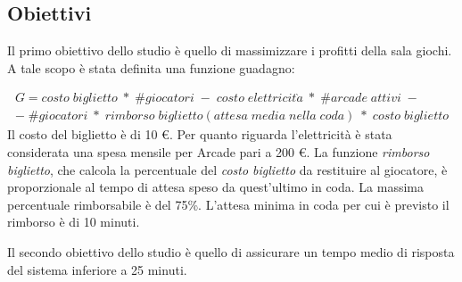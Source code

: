 \documentclass{article}
\begin{document}
\subsection{Obiettivi}
\par Il primo obiettivo dello studio è quello di massimizzare i profitti della sala giochi. A tale scopo è stata definita una funzione guadagno:

\begin{equation}
\begin{split}
   G = costo\; biglietto \;*\; \#giocatori\; -\; costo\; elettricit\grave a \;*\; \#arcade \;attivi\; - \\-\; \#giocatori \;*\; rimborso \;biglietto(attesa\;media\;nella\;coda)\;*\;costo\;biglietto
\end{split}
\end{equation}
Il costo del biglietto è di 10 \euro . Per quanto riguarda l'elettricità è stata considerata una spesa mensile per Arcade pari a 200 \euro. La funzione \textit{rimborso biglietto}, che calcola la percentuale del \textit{costo biglietto} da restituire al giocatore, è proporzionale al tempo di attesa speso da quest'ultimo in coda. La massima percentuale rimborsabile è del 75\%. L'attesa minima in coda per cui è previsto il rimborso è di 10 minuti. 
\\
\par Il secondo obiettivo dello studio è quello di assicurare un tempo medio di risposta del sistema inferiore a 25 minuti.



	
\end{document}
